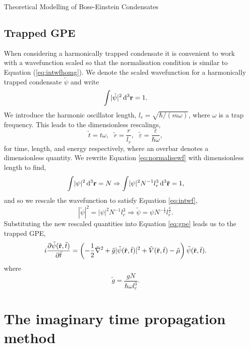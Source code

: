 \begin{chapter}{\label{cha:theoretical_model}Theoretical Modelling of Bose-Einstein Condensates}
	\subsection{\label{section:gpedimlesstrap} Trapped GPE}
		When considering a harmonically trapped condensate it is convenient to work with a wavefunction scaled so that the normalisation condition is similar to Equation (\ref{eq:intwfhomg}). We denote the scaled wavefunction for a harmonically trapped condensate $\tilde{\psi}$ and write
		\begin{equation}\label{eq:intwf}
			\int \! |\tilde{\psi}|^2 \, \mathrm{d}^3{\bf r} = 1.
		\end{equation}
		We introduce the harmonic oscillator length, $l_r = \sqrt{\hbar/(m\omega)}$, where $\omega$ is a trap frequency. This leads to the dimensionless rescalings,
		\begin{equation}
			\tilde{t} = t\omega, ~~~ \tilde{r} = \frac{r}{l_r}, ~~~ \tilde{\varepsilon}= \frac{\varepsilon}{\hbar\omega},
		\end{equation}
		for time, length, and energy respectively, where an overbar denotes a dimensionless quantity.
		We rewrite Equation \ref{eq:normalisewf} with dimensionless length to find,
		\begin{equation}
			\int \! |\psi|^2 \, \mathrm{d}^3{\bf r} = N \Rightarrow \int \! |\psi|^2 N^{-1} l_r^3 \, \mathrm{d}^3\tilde{\bf r} = 1,
		\end{equation}
		and so we rescale the wavefunction to satisfy Equation \ref{eq:intwf},
		\begin{equation}
			 |\tilde{\psi}|^2 = |\psi|^2 N^{-1} l_r^3 \Rightarrow \tilde{\psi} = \psi N^{-\frac{1}{2}} l_r^\frac{3}{2}.
		\end{equation}
	Substituting the new rescaled quantities into Equation \ref{eq:gpe} leads us to the trapped GPE,
	\begin{equation}\label{eq:dimgpetrapped}
		i\frac{\partial\tilde{\psi}({\tilde{\bf r}},\tilde{t})}{\partial {\tilde{t}}} = \left( -\frac{1}{2}\tilde{\nabla}^2 + \tilde{g}|\tilde{\psi}({\tilde{\bf r}},\tilde{t})|^2 + \tilde{V}({\tilde{\bf r}},\tilde{t}) - \tilde{\mu} \right) \tilde{\psi}({\tilde{\bf r}},\tilde{t}).
	\end{equation}
	where
	\begin{equation}
		 \tilde{g} = \frac{gN}{\hbar \omega l_r^3}.
	\end{equation}
\section{\label{section:imagTime} The imaginary time propagation method}


\end{chapter}
